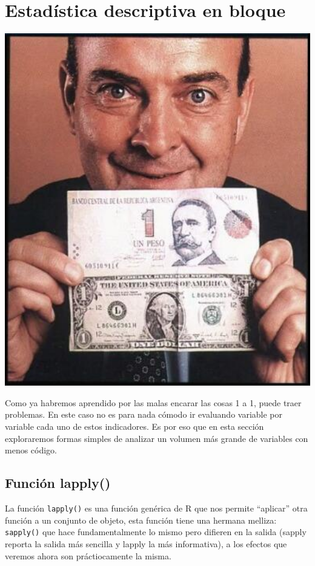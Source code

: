 \documentclass[
]{book}
\begin{document}
\hypertarget{estaduxedstica-descriptiva-en-bloque}{%
\section{Estadística descriptiva en bloque}\label{estaduxedstica-descriptiva-en-bloque}}

\includegraphics[width=5.38in]{img/mingo}

Como ya habremos aprendido por las malas encarar las cosas 1 a 1, puede traer problemas. En este caso no es para nada cómodo ir evaluando variable por variable cada uno de estos indicadores. Es por eso que en esta sección exploraremos formas simples de analizar un volumen más grande de variables con menos código.

\hypertarget{funciuxf3n-lapply}{%
\subsection{Función lapply()}\label{funciuxf3n-lapply}}

La función \texttt{lapply()} es una función genérica de R que nos permite ``aplicar'' otra función a un conjunto de objeto, esta función tiene una hermana melliza: \texttt{sapply()} que hace fundamentalmente lo mismo pero difieren en la salida (sapply reporta la salida más sencilla y lapply la más informativa), a los efectos que veremos ahora son práctiocamente la misma.
\end{document}
